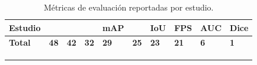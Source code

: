 \begin{xltabular}{\textwidth}{>{\raggedright\arraybackslash}X *{9}{>{\centering\arraybackslash}p{1.30cm}}}
\caption{Métricas de evaluación reportadas por estudio.}
\label{tab:rq2-metricas-general} \\

\hline
\textbf{Estudio} &
 &
 &
 &
\textbf{mAP} &
 &
\textbf{IoU} &
\textbf{FPS} &
\textbf{AUC} &
\textbf{Dice} \\
\hline
\endfirsthead

\endhead

\hline
\endfoot

\hline
\textbf{Total} & \textbf{48} & \textbf{42} & \textbf{32} & \textbf{29} & \textbf{25} & \textbf{23} & \textbf{21} & \textbf{6} & \textbf{1} \\
\hline
\\
 \\
\endlastfoot


\end{xltabular}
